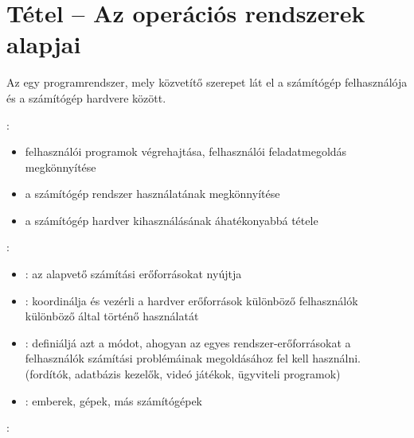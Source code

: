 \documentclass[main.tex]{subfiles}
\begin{document}
  \section{Tétel – Az operációs rendszerek alapjai} %
  
  Az  egy programrendszer,
  mely közvetítő szerepet lát el a számítógép felhasználója
  és a számítógép hardvere között.
  
  \vspace{1em}
  {\large {}:}
  \begin{itemize}
    \item felhasználói programok végrehajtása,
    felhasználói feladatmegoldás megkönnyítése

    \item a számítógép rendszer használatának
    megkönnyítése

    \item a számítógép hardver kihasználásának
    áhatékonyabbá tétele
  \end{itemize}

  {\large {}:}
  \begin{itemize}
    \item {}: az alapvető számítási erőforrásokat nyújtja
    \item {}: koordinálja és vezérli
    a hardver erőforrások különböző felhasználók különböző
    által történő használatát
    \item {}: definiáljá azt a módot,
    ahogyan az egyes rendszer-erőforrásokat a felhasználók
    számítási problémáinak megoldásához fel kell használni.
    (fordítók, adatbázis kezelők, videó játékok, ügyviteli programok)
    \item {}: emberek, gépek, más számítógépek
  \end{itemize}

  {\large {}:}
  \vspace{1em}
\end{document}
